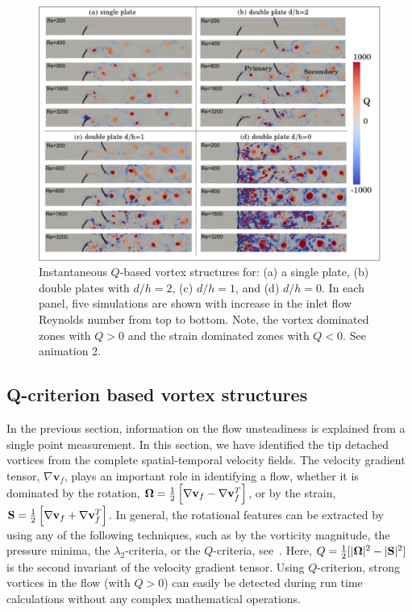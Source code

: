 \documentclass[aps,pre,twocolumn,aps,longbibliography]{revtex4-1}
\begin{document}
	\begin{figure}
		\begin{minipage}[c]{1\linewidth}
			\includegraphics[width=0.9\linewidth]{Fig15.pdf} 
		\end{minipage} 
		\caption{Instantaneous $Q$-based vortex structures for: (a) a single plate, (b) double plates with $d/h=2$, (c) $d/h=1$, and (d) $d/h=0$. In each panel, five simulations are shown with increase in the inlet flow Reynolds number from top to bottom. Note, the vortex dominated zones with $Q>0$ and the strain dominated zones with $Q<0$. See animation 2.}
		\label{fig:Q_double}
	\end{figure}
	
	
	\subsection{Q-criterion based vortex structures}
	
	In the previous section, information on the flow unsteadiness is explained from a single point measurement. In this section, we have identified the tip detached vortices from the complete spatial-temporal velocity fields. The velocity gradient tensor, $\nabla\mathbf{v}_f$, plays an important role in identifying a flow, whether it is dominated by the rotation, $\mathbf{\boldsymbol{\Omega}}={1\over 2}\left[\nabla\mathbf{v}_f-\nabla\mathbf{v}_f^T\right]$, or by the strain, $\mathbf{S}={1\over 2}\left[\nabla\mathbf{v}_f+\nabla\mathbf{v}_f^T\right]$. In general, the rotational features can be extracted by using any of the following techniques, such as by the vorticity magnitude, the pressure minima, the $\lambda_2$-criteria, or the $Q$-criteria, see~\cite{Hunt1994, Hussain1995, Holmes2012, Rowley2014}. Here, $Q={1\over 2}[|\mathbf{\boldsymbol{\Omega}}|^2-|\mathbf{S}|^2]$ is the second invariant of the velocity gradient tensor. Using $Q$-criterion, strong vortices in the flow (with $Q>0$) can easily be detected during run time calculations without any complex mathematical operations.
	
\end{document}
